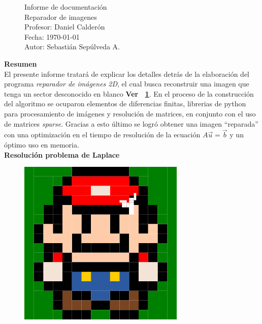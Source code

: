 \documentclass[letterpaper,10.7pt]{article}
\newcommand{\figref}[1]{\figurename~\ref{#1}}
\begin{document}
\pagestyle{style1}
\begin{figure}
\centering
\begin{minipage}[c]{0.8\textwidth}
\centering
\vspace{0.3cm}
{\large Informe de documentación}\\
{\Large Reparador de imagenes}
\vspace{0.3cm}\\
Profesor: Daniel Calderón\\
Fecha: \today\\
Autor: Sebastián Sepúlveda A.
\end{minipage}
\end{figure}

{\centering \textbf{{\Large Resumen}}}\\

El presente informe tratará de explicar los detalles detrás de la elaboración del programa \textit{reparador de imágenes 2D}, el cual busca reconstruir una imagen que tenga un sector desconocido en blanco \textbf{Ver \figref{fig:mario2}}. En el proceso de la construcción del algoritmo se ocuparon elementos de diferencias finitas, librerias de python para procesamiento de imágenes y resolución de matrices, en conjunto con el uso de matrices \textit{sparse}. Gracias a esto último se logró obtener una imagen ``reparada'' con una optimización en el tiempo de resolución de la ecuación $A \vec{u} = \vec{b}$ y un óptimo uso en memoria. \\


{\centering \textbf{{\Large Resolución problema de Laplace}}}\\

\begin{figure}
\centering
  \includegraphics[scale=0.45]{images/tarea3/mario_noreparado.png}
  \label{fig:mario2}
\end{figure}
\end{document}
